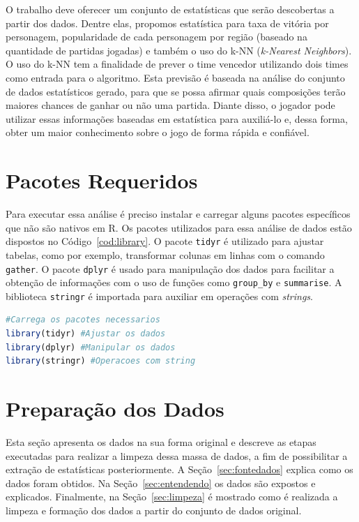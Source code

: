 \documentclass[a4paper]{article}
\begin{document}
O trabalho deve oferecer um conjunto de estatísticas que serão descobertas a partir dos dados. Dentre elas, propomos estatística para taxa de vitória por personagem, popularidade de cada personagem por região (baseado na quantidade de partidas jogadas) e também o uso do k-NN (\textit{k-Nearest Neighbors}). O uso do k-NN tem a finalidade de prever o time vencedor utilizando dois times como entrada para o algoritmo. Esta previsão é baseada na análise do conjunto de dados estatísticos gerado, para que se possa afirmar quais composições terão maiores chances de ganhar ou não uma partida. Diante disso, o jogador pode utilizar essas informações baseadas em estatística para auxiliá-lo e, dessa forma, obter um maior conhecimento sobre o jogo de forma rápida e confiável.

\section{Pacotes Requeridos}

Para executar essa análise é preciso instalar e carregar alguns pacotes específicos que não são nativos em R. Os pacotes utilizados para essa análise de dados estão dispostos no Código~\ref{cod:library}. O pacote \texttt{tidyr} é utilizado para ajustar tabelas, como por exemplo, transformar colunas em linhas com o comando \texttt{gather}. O pacote \texttt{dplyr} é usado para manipulação dos dados para facilitar a obtenção de informações com o uso de funções como \texttt{group\_by} e \texttt{summarise}. A biblioteca \texttt{stringr} é importada para auxiliar em operações com \textit{strings}.

\begin{lstlisting}[language=R, caption={Pacotes utilizados no projeto},label={cod:library}]
#Carrega os pacotes necessarios
library(tidyr) #Ajustar os dados
library(dplyr) #Manipular os dados
library(stringr) #Operacoes com string
\end{lstlisting}

\section{Preparação dos Dados}
Esta seção apresenta os dados na sua forma original e descreve as etapas executadas para realizar a limpeza dessa massa de dados, a fim de possibilitar a extração de estatísticas posteriormente. A Seção~\ref{sec:fontedados} explica como os dados foram obtidos. Na Seção~\ref{sec:entendendo} os dados são expostos e explicados. Finalmente, na Seção~\ref{sec:limpeza} é mostrado como é realizada a limpeza e formação dos dados a partir do conjunto de dados original.
\end{document}
